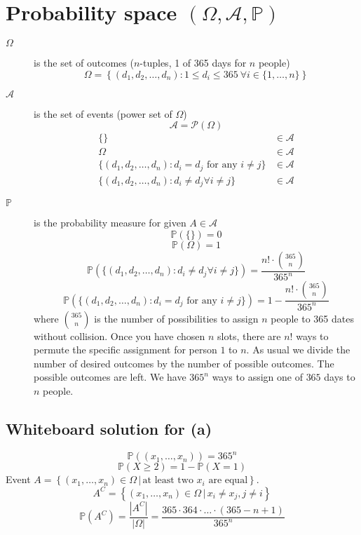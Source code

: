 \documentclass{article}
\newcommand\setdef[2]{\left\{\left.{#1}\,\right|\,{#2}\right\}}
\newcommand\card[1]{\left|#1\right|}
\begin{document}
\section[Probability space]{Probability space $(\Omega, \mathcal A, \mathbb P)$}
\begin{description}
  \item[$\Omega$] is the set of outcomes ($n$-tuples, 1 of 365 days for $n$ people)
    \[ \Omega = \left\{(d_1, d_2, \dots, d_n): 1 \leq d_i \leq 365 \: \forall i \in \{1, \dots, n\}\right\} \]
  \item[$\mathcal A$] is the set of events (power set of $\Omega$)
    \[ \mathcal A = \mathcal P(\Omega) \]
    \begin{align*}
      \{\} &\in \mathcal A \\
      \Omega &\in \mathcal A \\
      \{(d_1, d_2, \dots, d_n): d_i = d_j \text{ for any } i \neq j\} &\in \mathcal A \\
      \{(d_1, d_2, \dots, d_n): d_i \neq d_j \forall i \neq j\} &\in \mathcal A
    \end{align*}
  \item[$\mathbb P$] is the probability measure for given $A \in \mathcal A$
    \[ \mathbb P(\{\}) = 0 \]
    \[ \mathbb P(\Omega) = 1 \]
    \[ \mathbb P(\{(d_1, d_2, \dots, d_n): d_i \neq d_j \forall i \neq j\}) = \frac{n! \cdot {365 \choose n}}{365^n} \]
    \[ \mathbb P(\{(d_1, d_2, \dots, d_n): d_i = d_j \text{ for any } i \neq j\}) = 1 - \frac{n! \cdot {365 \choose n}}{365^n} \]
    where ${365 \choose n}$ is the number of possibilities to assign $n$ people to 365 dates without collision. Once you have chosen $n$ slots, there are $n!$ ways to permute the specific assignment for person $1$ to $n$. As usual we divide the number of desired outcomes by the number of possible outcomes. The possible outcomes are left. We have $365^n$ ways to assign one of $365$ days to $n$ people.
\end{description}

\subsection{Whiteboard solution for (a)}
\[ \mathbb P((x_1, \dots, x_n)) = 365^n \]
\[ \mathbb P(X \geq 2) = 1 - \mathbb P(X = 1) \]
Event $A = \setdef{(x_1, \dots, x_n) \in \Omega}{\text{at least two $x_i$ are equal}}$.
\[ A^C = \setdef{(x_1, \dots, x_n) \in \Omega}{x_i \neq x_j, j \neq i} \]
\[ \mathbb P(A^C) = \frac{\card{A^C}}{\card{\Omega}} = \frac{365 \cdot 364 \cdot \dots \cdot (365-n+1)}{365^n} \]
\end{document}
